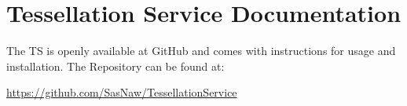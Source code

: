 \chapter{Tessellation Service Documentation}
\label{secC}
The TS is openly available at GitHub and comes with instructions for usage and installation. The Repository can be found at:

\url{https://github.com/SasNaw/TessellationService}


